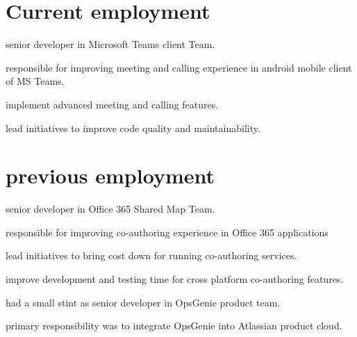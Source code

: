 \begin{minipage}[t]{0.66\textwidth} %


\section{Current employment}

\vspace{\topsep} %
\begin{tightitemize}
\item senior developer in Microsoft Teams client Team.
\item responsible for improving meeting and calling experience in android mobile client of MS Teams.
\item implement advanced meeting and calling features.
\item lead initiatives to improve code quality and maintainability.
\end{tightitemize}

\sectionspace %


\section{previous employment}

\begin{tightitemize}
\item senior developer in Office 365 Shared Map Team.
\item responsible for improving co-authoring experience in Office 365 applications
\item lead initiatives to bring cost down for running co-authoring services.
\item improve development and testing time for cross platform co-authoring features.
\end{tightitemize}

\sectionspace %


\begin{tightitemize}
\item had a small stint as senior developer in OpsGenie product team.
\item primary responsibility was to integrate OpsGenie into Atlassian product cloud.
\end{tightitemize}


\end{minipage}
